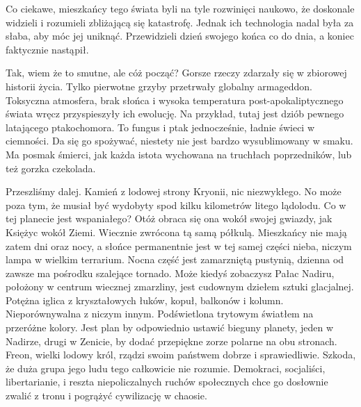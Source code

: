 Co ciekawe, mieszkańcy tego świata byli na tyle rozwinięci naukowo, że doskonale widzieli i rozumieli zbliżającą się katastrofę.
Jednak ich technologia nadal była za słaba, aby móc jej uniknąć.
Przewidzieli dzień swojego końca co do dnia, a koniec faktycznie nastąpił.

Tak, wiem że to smutne, ale cóż począć? Gorsze rzeczy zdarzały się w zbiorowej historii życia. 
Tylko pierwotne grzyby przetrwały globalny armageddon.
Toksyczna atmosfera, brak słońca i wysoka temperatura post-apokaliptycznego świata wręcz przyspieszyły ich ewolucję.
Na przykład, tutaj jest dziób pewnego latającego ptakochomora. To fungus i ptak jednocześnie, ładnie świeci w ciemności.
Da się go spożywać, niestety nie jest bardzo wysublimowany w smaku. 
Ma posmak śmierci, jak każda istota wychowana na truchłach poprzedników, lub też gorzka czekolada.

Przeszliśmy dalej. Kamień z lodowej strony Kryonii, nic niezwykłego. 
No może poza tym, że musiał być wydobyty spod kilku kilometrów litego lądolodu.
Co w tej planecie jest wspaniałego? Otóż obraca się ona wokół swojej gwiazdy, jak Księżyc wokół Ziemi. 
Wiecznie zwrócona tą samą półkulą.
Mieszkańcy nie mają zatem dni oraz nocy, a słońce permanentnie jest w tej samej części nieba, niczym lampa w wielkim terrarium.
Nocna część jest zamarzniętą pustynią, dzienna od zawsze ma pośrodku szalejące tornado.
Może kiedyś zobaczysz Pałac Nadiru, położony w centrum wiecznej zmarzliny, jest cudownym dziełem sztuki glacjalnej.
Potężna iglica z kryształowych łuków, kopuł, balkonów i kolumn. Nieporównywalna z niczym innym.
Podświetlona trytowym światłem na przeróżne kolory. 
Jest plan by odpowiednio ustawić bieguny planety, jeden w Nadirze, drugi w Zenicie, by dodać przepiękne zorze polarne na obu stronach.
Freon, wielki lodowy król, rządzi swoim państwem dobrze i sprawiedliwie.
Szkoda, że duża grupa jego ludu tego całkowicie nie rozumie. 
Demokraci, socjaliści, libertarianie, i reszta niepoliczalnych ruchów społecznych chce go dosłownie zwalić z tronu i pogrążyć cywilizację w chaosie.


